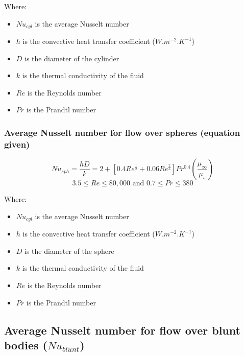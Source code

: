 \documentclass[11pt]{article}
\begin{document}
Where:
\begin{itemize}
\item \(Nu_{cyl}\) is the average Nusselt number
\item \(h\) is the convective heat transfer coefficient (\(\unit{W.m^{-2}.K^{-1}}\))
\item \(D\) is the diameter of the cylinder
\item \(k\) is the thermal conductivity of the fluid
\item \(Re\) is the Reynolds number
\item \(Pr\) is the Prandtl number
\end{itemize}
\subsubsection{Average Nusselt number for flow over spheres (equation given)}
\label{sec:org9d472ad}
\[Nu_{sph} = \frac{hD}{k} = 2 + \left[0.4 Re^{\frac{1}{2}} + 0.06 Re^{\frac{2}{3}} \right] Pr^{0.4} \left(\frac{\mu_{\infty}}{\mu_s} \right)\]
\[3.5 \le Re \le 80,000 \text{ and } 0.7 \le Pr \le 380\]

Where:
\begin{itemize}
\item \(Nu_{cyl}\) is the average Nusselt number
\item \(h\) is the convective heat transfer coefficient (\(\unit{W.m^{-2}.K^{-1}}\))
\item \(D\) is the diameter of the sphere
\item \(k\) is the thermal conductivity of the fluid
\item \(Re\) is the Reynolds number
\item \(Pr\) is the Prandtl number
\end{itemize}

 \newpage
\subsection{Average Nusselt number for flow over blunt bodies (\(Nu_{blunt}\))}
\label{sec:org3bb3608}
\end{document}
